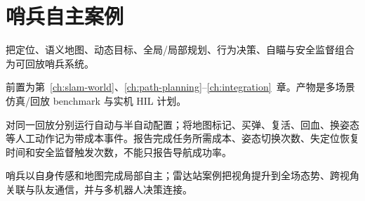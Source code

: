 \chapter{哨兵自主案例}
\label{ch:sentry-case}

\begin{learningobjectives}
把定位、语义地图、动态目标、全局/局部规划、行为决策、自瞄与安全监督组合为可回放哨兵系统。
\end{learningobjectives}

\begin{prerequisites}
前置为第~\ref{ch:slam-world}、\ref{ch:path-planning}--\ref{ch:integration}~章。产物是多场景仿真/回放 benchmark 与实机 HIL 计划。
\end{prerequisites}


\begin{engineeringcheck}
对同一回放分别运行自动与半自动配置；将地图标记、买弹、复活、回血、换姿态等人工动作记为带成本事件。报告完成任务所需成本、姿态切换次数、失定位恢复时间和安全监督触发次数，不能只报告导航成功率。
\end{engineeringcheck}

\begin{chaptertransition}
哨兵以自身传感和地图完成局部自主；雷达站案例把视角提升到全场态势、跨视角关联与队友通信，并与多机器人决策连接。
\end{chaptertransition}
